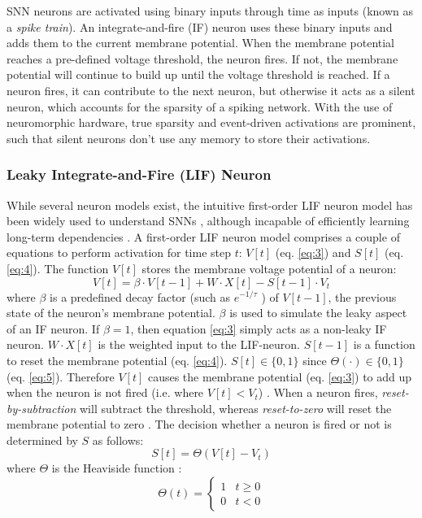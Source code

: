 \documentclass{article} %
\begin{document}
SNN neurons are activated using binary inputs through time as inputs (known as a \emph{spike train}). An integrate-and-fire (IF) neuron uses these binary inputs and adds them to the current membrane potential. When the membrane potential reaches a pre-defined voltage threshold, the neuron fires. If not, the membrane potential will continue to build up until the voltage threshold is reached. If a neuron fires, it can contribute to the next neuron, but otherwise it acts as a silent neuron, which accounts for the sparsity of a spiking network. With the use of neuromorphic hardware, true sparsity and event-driven activations are prominent, such that silent neurons don't use any memory to store their activations.

\subsubsection{Leaky Integrate-and-Fire (LIF) Neuron}
While several neuron models exist, the intuitive first-order LIF neuron model has been widely used to understand SNNs \citep{kim_sharing_2023}, although incapable of efficiently learning long-term dependencies \citep{eshraghian_training_2023-1}. A first-order LIF neuron model \citep{dayan_theoretical_2001} comprises a couple of equations to perform activation for time step \(t\): \(V[t]\) (eq. \ref{eq:3}) and \(S[t]\) (eq. \ref{eq:4}). The function \(V[t]\) stores the membrane voltage potential of a neuron:
\begin{equation}\label{eq:3}
  V[t] = \beta \cdot V[t-1] + W \cdot X[t] - S[t-1] \cdot V_{t}
\end{equation}
where \(\beta\) is a predefined decay factor (such as \(e^{-1/\tau}\) \citep{eshraghian_training_2023-1}) of \(V[t-1]\), the previous state of the neuron's membrane potential. \(\beta\) is used to simulate the leaky aspect of an IF neuron. If \(\beta = 1\), then equation \ref{eq:3} simply acts as a non-leaky IF neuron. \(W \cdot X[t]\) is the weighted input to the LIF-neuron. \(S[t-1]\) is a function to reset the membrane potential (eq. \ref{eq:4}). \(S[t] \in \{0,1\}\) since \(\Theta(\cdot) \in \{0,1\}\) (eq. \ref{eq:5}). Therefore \(V[t]\) causes the membrane potential (eq. \ref{eq:3}) to add up when the neuron is not fired (i.e. where \(V[t] < V_{t}\)) \citep{tavanaei_deep_2019-1}. When a neuron fires, \emph{reset-by-subtraction} will subtract the threshold, whereas \emph{reset-to-zero} will reset the membrane potential to zero \citep{eshraghian_training_2023-1}. The decision whether a neuron is fired or not is determined by \(S\) as follows:
\begin{equation}\label{eq:4}
  S[t] = \Theta (V[t] - V_{t})
\end{equation}
where \(\Theta\) is the Heaviside function \citep{legua_heaviside_2006}:
\begin{equation}\label{eq:5}
  \Theta(t) =
  \begin{cases}
    1 & t \geq 0 \\
    0 & t < 0
  \end{cases}
\end{equation}
\end{document}
